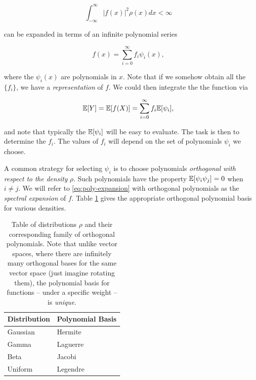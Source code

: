 \documentclass[../primer.tex]{subfiles}
\begin{document}
\begin{equation}
  \int_{-\infty}^{\infty} |f(x)|^2 \rho(x) dx < \infty
\end{equation}

\noindent can be expanded in terms of an infinite polynomial series

\begin{equation} \label{eq:poly-expansion}
  f(x) = \sum_{i=0}^{\infty} f_i \psi_i(x),
\end{equation}

\noindent where the $\psi_i(x)$ are polynomials in
$x$.\cite{cameron1947orthogonal} Note that if we somehow obtain all the
$\{f_i\}$, we have a \emph{representation} of $f$. We could then integrate the
the function via

\begin{equation}
  \mathbb{E}[Y] = \mathbb{E}[f(X)] = \sum_{i=0}^{\infty} f_i \mathbb{E}[\psi_i],
\end{equation}

\noindent and note that typically the $\mathbb{E}[\psi_i]$ will be easy to evaluate. The
task is then to determine the $f_i$. The values of $f_i$ will depend on the set
of polynomials $\psi_i$ we choose.

A common strategy for selecting $\psi_i$ is to choose polynomials
\emph{orthogonal with respect to the density} $\rho$.\cite{xiu2002wiener} Such
polynomials have the property $\mathbb{E}[\psi_i\psi_j] = 0$ when $i\neq j$. We will
refer to \eqref{eq:poly-expansion} with orthogonal polynomials as the
\emph{spectral expansion} of $f$. Table \ref{tab:pce-basis} gives the
appropriate orthogonal polynomial basis for various densities.

\begin{table}[!ht]
  \centering
  \begin{tabular}{@{}ll@{}}
    Distribution & Polynomial Basis \\
    \hline
    Gaussian     & Hermite \\
    Gamma        & Laguerre \\
    Beta         & Jacobi \\
    Uniform      & Legendre
  \end{tabular}
  \caption{Table of distributions $\rho$ and their corresponding family of
    orthogonal polynomials. Note that unlike vector spaces, where there are
    infinitely many orthogonal bases for the same vector space (just imagine
    rotating them), the polynomial basis for functions -- under a specific
    weight -- is \emph{unique}.}
  \label{tab:pce-basis}
\end{table}
\end{document}
